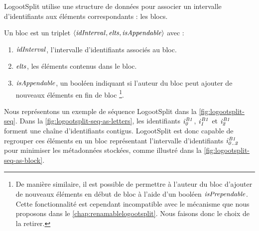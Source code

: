 


LogootSplit utilise une structure de données pour associer un intervalle d'identifiants aux éléments correspondants : les blocs.

\begin{definition}[Bloc]
  Un bloc est un triplet $\langle \mathit{idInterval}, \mathit{elts}, \mathit{isAppendable} \rangle$ avec :
  \begin{enumerate}
    \item $\mathit{idInterval}$, l'intervalle d'identifiants associés au bloc.
    \item $\mathit{elts}$, les éléments contenus dans le bloc.
    \item $\mathit{isAppendable}$, un booléen indiquant si l'auteur du bloc peut ajouter de nouveaux éléments en fin de bloc
    \footnote{
      De manière similaire, il est possible de permettre à l'auteur du bloc d'ajouter de nouveaux éléments en début de bloc à l'aide d'un booléen $\mathit{isPrependable}$.
      Cette fonctionnalité est cependant incompatible avec le mécanisme que nous proposons dans le \autoref{chap:renamablelogootsplit}.
      Nous faisons donc le choix de la retirer.
    }.
  \end{enumerate}
\end{definition}

Nous représentons un exemple de séquence LogootSplit dans la \autoref{fig:logootsplit-seq}.
Dans la \autoref{fig:logootsplit-seq-as-letters}, les identifiants $\mathit{i}^{\mathit{B1}}_{\mathit{0}}$, $\mathit{i}^{\mathit{B1}}_{\mathit{1}}$ et $\mathit{i}^{\mathit{B1}}_{\mathit{2}}$ forment une chaîne d'identifiants contigus.
LogootSplit est donc capable de regrouper ces éléments en un bloc représentant l'intervalle d'identifiants $\mathit{i}^{\mathit{B1}}_{\mathit{0..2}}$ pour minimiser les métadonnées stockées, comme illustré dans la \autoref{fig:logootsplit-seq-as-block}.

